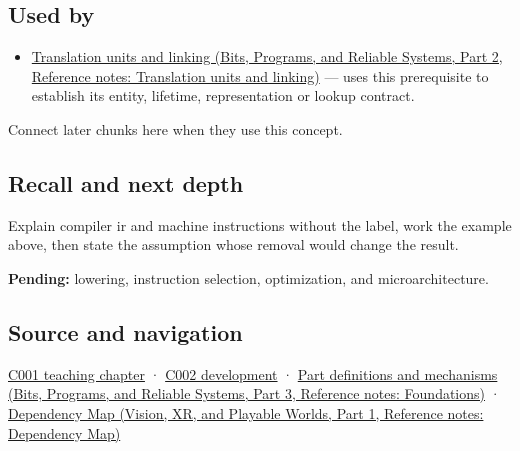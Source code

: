 \subsection{Used by}\label{appendix-942ad41afb30-used-by}

\hypertarget{appendix-942ad41afb30-used-by}{}

\begin{itemize}
\tightlist
\item
  \href{../01-Bits-Programs-and-Reliable-Systems-P02/main.pdf\#appendix-806686359e1b}{Translation units and linking (Bits, Programs, and Reliable Systems, Part 2, Reference notes: Translation units and linking)} --- uses this prerequisite to establish its entity, lifetime, representation or lookup contract.
\end{itemize}

Connect later chunks here when they use this concept.

\subsection{Recall and next depth}\label{appendix-942ad41afb30-recall-and-next-depth}

\hypertarget{appendix-942ad41afb30-recall-and-next-depth}{}

Explain compiler ir and machine instructions without the label, work the example above, then state the assumption whose removal would change the result.

\textbf{Pending:} lowering, instruction selection, optimization, and microarchitecture.

\subsection{Source and navigation}\label{appendix-942ad41afb30-source-and-navigation}

\hypertarget{appendix-942ad41afb30-source-and-navigation}{}

\hyperref[01-foundations-i-ch001-from-a-signal-to-an-interpretation]{C001 teaching chapter} · \hyperref[01-foundations-i-ch001-arithmetic-becomes-a-policy]{C002 development} · \href{../01-Bits-Programs-and-Reliable-Systems-P03/main.pdf\#appendix-fd090d982a15}{Part definitions and mechanisms (Bits, Programs, and Reliable Systems, Part 3, Reference notes: Foundations)} · \href{../07-Vision-XR-and-Playable-Worlds-P01/main.pdf\#appendix-4ad47bdd269a}{Dependency Map (Vision, XR, and Playable Worlds, Part 1, Reference notes: Dependency Map)}

